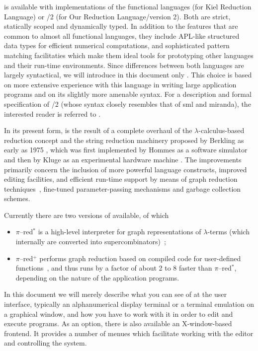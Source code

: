 \pired is available with implementations of the functional languages \kir (for {\mys Kiel Reduction Language})
or \orel/2 (for {\mys Our Reduction Language}/version 2). Both are
strict, statically scoped and dynamically typed. In addition to
the features that are
common to almost all functional languages, they include APL-like
structured data types \cite{iv62,abr70,schm86,schm91} for efficient numerical computations, and
sophisticated
{\mys pattern matching} facilitaties which make them ideal tools for prototyping
other languages and their run-time environments. 
Since differences between both languages are
largely syntactical, we will introduce in this document only \kir.
This choice is based on more extensive experience with this language in
writing large application programs and on its slightly more amenable syntax.
For a description and formal specification of \orel/2 (whose syntax 
closely  resembles that of {\sc sml} and {\sc miranda}), the interested reader
is referred to \cite{ples90}.  
   
In its present form, \pired is the result of a complete overhaul of the
$\lambda$-calculus-based reduction concept and the string reduction machinery proposed by
Berkling as early as 1975 \cite{berk75,berk78}, which was first
 implemented by Hommes as a software
simulator \cite{homm77b,homm80} and then by Kluge as an experimental
 hardware machine \cite{klug79,klug80}. The
improvements primarily concern the inclusion of more powerful language
constructs, improved editing facilities, and  efficient run-time support by means of graph
reduction techniques~\cite{schm91,zim91}, 
fine-tuned parameter-passing mechanisms and garbage collection schemes.

Currently there are two versions of \pired available, of which
\begin{itemize}
\item $\pi$--{\sc red}$^*$ is a {\mys high-level interpreter} for graph representations
of $\lambda$-terms (which internally are converted into supercombinators)~\cite{schm91};
\item $\pi$--{\sc red}$^+$ performs {\mys graph reduction} based on compiled code for
user-defined functions~\cite{gaer91}, and thus runs by a factor of about 2 to 8
faster than $\pi$--{\sc red}$^*$, depending on the nature of the 
application programs.
\end{itemize}

In this document we will merely describe what you can see of \pired at
the
user interface, typically an alphanumerical display terminal or a terminal
emulation on a graphical window, and how you have to work with it
in order to edit and execute \kir programs. As an option, there is also available
an X-window-based frontend.  It provides a number of menues which facilitate working with the
editor and controlling the system. 

